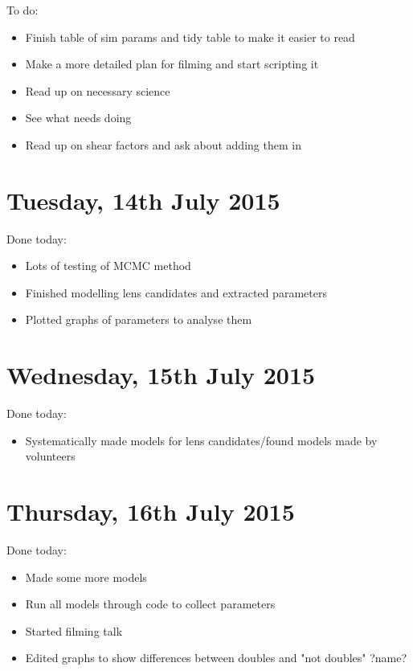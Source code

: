 \documentclass{article}
\begin{document}
\noindent To do:
\begin{itemize}
  \item Finish table of sim params and tidy table to make it easier to read
  \item Make a more detailed plan for filming and start scripting it
  \item Read up on necessary science
  \item See what needs doing
  \item Read up on shear factors and ask about adding them in
\end{itemize}\newpage

\section{Tuesday, 14th July 2015}
\noindent Done today:
\begin{itemize}
  \item Lots of testing of MCMC method
  \item Finished modelling lens candidates and extracted parameters
  \item Plotted graphs of parameters to analyse them
\end{itemize}

\section{Wednesday, 15th July 2015}
\noindent Done today:
\begin{itemize}
  \item Systematically made models for lens candidates/found models made by volunteers
\end{itemize}

\section{Thursday, 16th July 2015}
\noindent Done today:
\begin{itemize}
  \item Made some more models
  \item Run all models through code to collect parameters
  \item Started filming talk
  \item Edited graphs to show differences between doubles and "not doubles" ?name?
\end{itemize}
\end{document}
